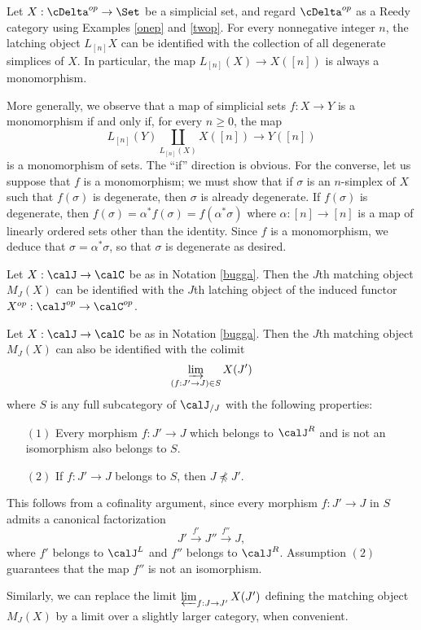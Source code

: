 \begin{example}\label{croupus}
Let $X: \cDelta^{op} \rightarrow \Set$ be a simplicial set, and regard
$\cDelta^{op}$ as a Reedy category using Examples \ref{onep} and \ref{twop}.
For every nonnegative integer $n$, the latching object $L_{[n]} X$ can be identified
with the collection of all degenerate simplices of $X$. In particular, the map
$L_{[n]}(X) \rightarrow X([n])$ is always a monomorphism.

More generally, we observe that a map of simplicial sets $f: X \rightarrow Y$ is a monomorphism if and only if, for every $n \geq 0$, the map
$$ L_{[n]}(Y) \coprod_{ L_{[n]}(X) } X([n]) \rightarrow Y([n])$$
is a monomorphism of sets. The ``if'' direction is obvious. For the converse,
let us suppose that $f$ is a monomorphism; we must show that if
$\sigma$ is an $n$-simplex of $X$ such that $f(\sigma)$ is degenerate, then
$\sigma$ is already degenerate. If $f(\sigma)$ is degenerate, then
$f(\sigma) = \alpha^{\ast} f(\sigma) = f( \alpha^{\ast} \sigma)$ where $\alpha: [n] \rightarrow [n]$ is a map of linearly ordered sets other than the identity. Since $f$ is a monomorphism, we deduce that $\sigma = \alpha^{\ast} \sigma$, so that $\sigma$ is degenerate as desired.
\end{example}

\begin{remark}
Let $X: \calJ \rightarrow \calC$ be as in Notation \ref{bugga}. Then the
$J$th matching object $M_{J}(X)$ can be identified with the $J$th latching object
of the induced functor $X^{op}: \calJ^{op} \rightarrow \calC^{op}$. 
\end{remark}

\begin{remark}\label{surpose}
Let $X: \calJ \rightarrow \calC$ be as in Notation \ref{bugga}. Then the
$J$th matching object $M_{J}(X)$ can also be identified with the colimit
$$ \varinjlim_{(f: J' \rightarrow J) \in S} X(J')$$
where $S$ is any full subcategory of $\calJ_{/J}$ with the following properties:
\begin{itemize}
\item[$(1)$] Every morphism $f: J' \rightarrow J$ which belongs to
$\calJ^{R}$ and is not an isomorphism also belongs to $S$.
\item[$(2)$] If $f: J' \rightarrow J$ belongs to $S$, then
$J \npreceq J'$.
\end{itemize}
This follows from a cofinality argument, since every morphism
$f: J' \rightarrow J$ in $S$ admits a canonical factorization
$$ J' \stackrel{f'}{\rightarrow} J'' \stackrel{f''}{\rightarrow} J,$$
where $f'$ belongs to $\calJ^{L}$ and $f''$ belongs to $\calJ^{R}$. Assumption
$(2)$ guarantees that the map $f''$ is not an isomorphism.

Similarly, we can replace the limit $\varprojlim_{ f: J \rightarrow J'} X(J')$
defining the matching object $M_{J}(X)$ by a limit over a slightly larger category, when convenient.
\end{remark}

